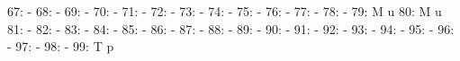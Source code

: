 \documentclass[nojss]{jss}
\begin{document}
\begin{Schunk}
\begin{Soutput}
 67:                                                                          -
 68:                                                                          -
 69:                                                                          -
 70:                                                                          -
 71:                                                                          -
 72:                                                                          -
 73:                                                                          -
 74:                                                                          -
 75:                                                                          -
 76:                                                                          -
 77:                                                                          -
 78:                                                                          -
 79:                                          M                               u
 80:                                          M                               u
 81:                                                                          -
 82:                                                                          -
 83:                                                                          -
 84:                                                                          -
 85:                                                                          -
 86:                                                                          -
 87:                                                                          -
 88:                                                                          -
 89:                                                                          -
 90:                                                                          -
 91:                                                                          -
 92:                                                                          -
 93:                                                                          -
 94:                                                                          -
 95:                                                                          -
 96:                                                                          -
 97:                                                                          -
 98:                                                                          -
 99:                                          T                               p

\end{Soutput}
\end{Schunk}
\end{document}
